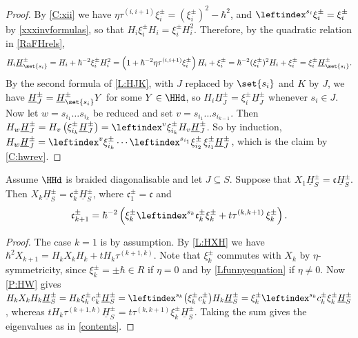 \documentclass[a4paper,11pt]{amsart}
\numberwithin{equation}{subsection}
\theoremstyle{definition}
\theoremstyle{theorem}
\theoremstyle{remark}
\newcommand\conts{{\mathfrak{c}}}
\newcommand\HJpm{\underline{H}^\pm}
\newcommand\taui[1][i]{\tau^{(#1)}}
\begin{document}
 \begin{proof}
   By \autoref{C:xii} we have $\eta\taui[i,i+1]\xi^\pm_i=(\xi^\pm_i)^2-\hbar^2$,
   and $\leftindex^{s_i}{{\xi^\pm_i}}=\xi^\pm_i$ by \autoref{xxxinvformulas}, so that
   $H_i\xi^\pm_iH_i=\xi^\pm_iH_i^2$. Therefore, by the quadratic relation in
   \autoref{RaFHrels},
   \[
     H_i\HJpm_{\set{s_i}}=H_i+\hbar^{-2}\xi^\pm_iH_i^2
       =\left(1+\hbar^{-2}\eta\taui[i,i+1]\xi^\pm_i\right)H_i+\xi^\pm_i
       =\hbar^{-2}(\xi^\pm_i)^2H_i+\xi^\pm_i=\xi^\pm_i\HJpm_{\set{s_i}} .
   \]
   By the second formula of \autoref{L:HJK}, with $J$ replaced by $\set{s_i}$ and $K$
   by $J$, we have $\HJpm_J=\HJpm_{\set{s_i}}Y$ for some $Y\in\HHd$, so
   $H_i\HJpm_J=\xi^\pm_i\HJpm_J$ whenever $s_i\in J$. Now let
   $w=s_{i_1}\dots s_{i_k}$ be reduced and set $v=s_{i_1}\dots s_{i_{k-1}}$. Then
   $H_w\HJpm_J=H_v\left(\xi^\pm_{i_k}\HJpm_J\right)
     =\leftindex^v{{\xi^\pm_{i_k}}}H_v\HJpm_J$. So by induction,
   $H_w\HJpm_J=\leftindex^{v}{{\xi^\pm_{i_k}}}\cdots
     \leftindex^{s_{i_1}}{{\xi^\pm_{i_2}}}\,\xi^\pm_{i_1}\HJpm_J$, which is the claim
   by \autoref{C:hwrev}.
 \end{proof}

 \begin{Corollary}\label{C:TrivialContents}
 Assume $\HHd$ is braided diagonalisable and let $J\subseteq S$.
    Suppose that $X_1\HJpm_S=\conts\HJpm_S$. Then $X_k\HJpm_S=\conts^\pm_k\HJpm_S$, where
    $\conts^\pm_1=\conts$ and
    \begin{equation}\label{contents}
      \conts^\pm_{k+1}=\hbar^{-2}\left(\xi^\pm_k\leftindex^{s_k}{{\conts^\pm_k}}\xi^\pm_k
        + t\taui[k,k+1]\,\xi^\pm_k\right).
    \end{equation}
 \end{Corollary}

 \begin{proof}
   The case $k=1$ is by assumption. By \autoref{L:HXH} we have
   $\hbar^2X_{k+1}=H_kX_kH_k+tH_k\taui[k+1,k]$. Note that
   $\xi^\pm_k$ commutes with
   $X_k$ by $\eta$-symmetricity, since  $\xi^\pm_k=\pm\hbar\in R$ if $\eta=0$ and by  \autoref{Lfunnyequation} if $\eta\not=0$. Now \autoref{P:HW} gives  $H_kX_kH_k\HJpm_S=H_k\xi^\pm_kc^\pm_k\HJpm_S
       =\leftindex^{s_k}{\left(\xi^\pm_kc^\pm_k\right)}H_k\HJpm_S
       =\xi^\pm_k\leftindex^{s_k}{{c^\pm_k}}\xi^\pm_k\HJpm_S$,
       whereas  $tH_k\taui[k+1,k]\HJpm_S=t\taui[k,k+1]\xi^\pm_k\HJpm_S$. Taking the sum gives the eigenvalues as in \autoref{contents}.
 \end{proof}
\end{document}
